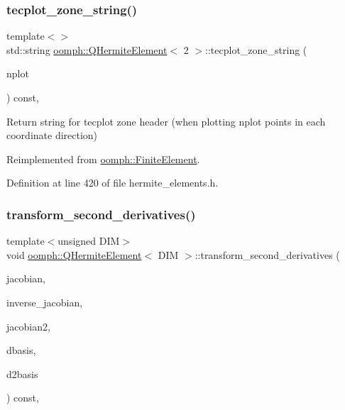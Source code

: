 \subsubsection{\texorpdfstring{tecplot\+\_\+zone\+\_\+string()}{tecplot\_zone\_string()}\hspace{0.1cm}{\footnotesize\ttfamily [3/3]}}
{\footnotesize\ttfamily template$<$$>$ \\
std\+::string \hyperlink{classoomph_1_1QHermiteElement}{oomph\+::\+Q\+Hermite\+Element}$<$ 2 $>$\+::tecplot\+\_\+zone\+\_\+string (\begin{DoxyParamCaption}\item[{const unsigned \&}]{nplot }\end{DoxyParamCaption}) const\hspace{0.3cm}{\ttfamily [inline]}, {\ttfamily [virtual]}}

Return string for tecplot zone header (when plotting nplot points in each coordinate direction) 

Reimplemented from \hyperlink{classoomph_1_1FiniteElement_a3193df31f9ce38e0609d17a8ffb386c6}{oomph\+::\+Finite\+Element}.



Definition at line 420 of file hermite\+\_\+elements.\+h.

\mbox{\label{classoomph_1_1QHermiteElement_a0f000889085286deef3b273043522834}} 
\subsubsection{\texorpdfstring{transform\+\_\+second\+\_\+derivatives()}{transform\_second\_derivatives()}}
{\footnotesize\ttfamily template$<$unsigned D\+IM$>$ \\
void \hyperlink{classoomph_1_1QHermiteElement}{oomph\+::\+Q\+Hermite\+Element}$<$ D\+IM $>$\+::transform\+\_\+second\+\_\+derivatives (\begin{DoxyParamCaption}\item[{const \hyperlink{classoomph_1_1DenseMatrix}{Dense\+Matrix}$<$ double $>$ \&}]{jacobian,  }\item[{const \hyperlink{classoomph_1_1DenseMatrix}{Dense\+Matrix}$<$ double $>$ \&}]{inverse\+\_\+jacobian,  }\item[{const \hyperlink{classoomph_1_1DenseMatrix}{Dense\+Matrix}$<$ double $>$ \&}]{jacobian2,  }\item[{\hyperlink{classoomph_1_1DShape}{D\+Shape} \&}]{dbasis,  }\item[{\hyperlink{classoomph_1_1DShape}{D\+Shape} \&}]{d2basis }\end{DoxyParamCaption}) const\hspace{0.3cm}{\ttfamily [inline]}, {\ttfamily [virtual]}}



